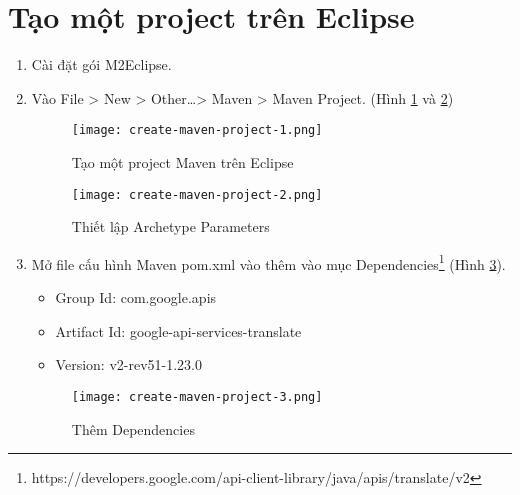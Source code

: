 \documentclass[../thesis.tex]{subfiles}
\begin{document}
\section{Tạo một project trên Eclipse}
\begin{enumerate}
	\item Cài đặt gói M2Eclipse.
	\item Vào File > New > Other\ldots > Maven > Maven Project. (Hình \ref{Tao mot project Maven tren Eclipse} và \ref{Thiet lap Archetype Parameters})
	
	\begin{figure}
		\texttt{[image: create-maven-project-1.png]}
		\caption{Tạo một project Maven trên Eclipse}
		\label{Tao mot project Maven tren Eclipse}
	\end{figure}
	\begin{figure}
		\texttt{[image: create-maven-project-2.png]}
		\caption{Thiết lập Archetype Parameters}
		\label{Thiet lap Archetype Parameters}
	\end{figure}
	
	\item Mở file cấu hình Maven pom.xml vào thêm vào mục Dependencies\footnote{https://developers.google.com/api-client-library/java/apis/translate/v2} (Hình \ref{Them Dependencies}).
	
	\begin{itemize}
		\item Group Id: com.google.apis
		\item Artifact Id: google-api-services-translate
		\item Version: v2-rev51-1.23.0
	\end{itemize}
	
	\begin{figure}
		\texttt{[image: create-maven-project-3.png]}
		\caption{Thêm Dependencies}
		\label{Them Dependencies}
	\end{figure}
	
\end{enumerate}
\end{document}
